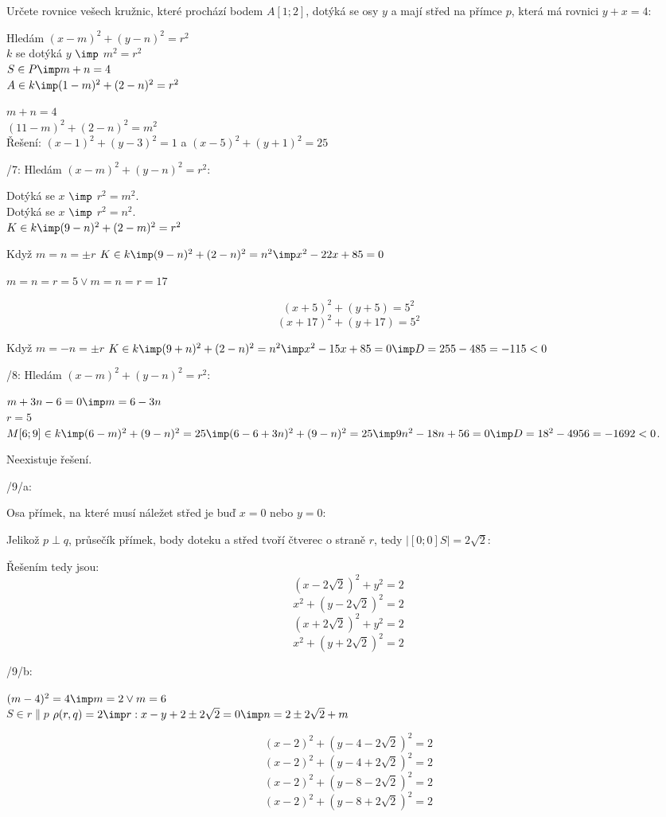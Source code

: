 
\BeginDoc{}
 \Pr Určete rovnice vešech kružnic, které prochází bodem $A[1;2]$, dotýká se osy $y$ a mají střed na přímce $p$, která má rovnici $y+x = 4$:

 Hledám $(x-m)^2 + (y-n)^2 = r^2$\\
$k$ se dotýká $y$ $\imp$ $m^2 = r^2$\\
$S \in P \imp m + n  = 4$\\
$A \in k \imp (1-m)^2 + (2-n)^2 = r^2$

$m+n = 4$\\
$(11-m)^2 + (2-n)^2 = m^2 $\\

Řešení:
$(x-1)^2 + (y-3)^2 = 1$
a
$(x-5)^2 + (y+1)^2 = 25$

/7:
Hledám $(x-m)^2 + (y-n)^2 = r^2$:

Dotýká se $x$ $\imp$ $r^2 = m^2$.\\
Dotýká se $x$ $\imp$ $r^2 = n^2$.\\
$K \in k \imp (9-n)^2 + (2-m)^2 = r^2 $ 

Když $m=n=\pm r$
$K \in k \imp (9-n)^2 + (2-n)^2 = n^2 \imp x^2-22x + 85 =0$ 

$m=n=r=5 \lor m=n=r = 17$

$$ (x+5)^2 + (y+5) = 5^2 $$
$$ (x+17)^2 + (y+17) = 5^2 $$

Když $m=-n=\pm r$
$K \in k \imp (9+n)^2 + (2-n)^2 = n^2 \imp x^2-15x + 85 =0 \imp D=255-4\*85 = -115 < 0$ 

/8:
Hledám $(x-m)^2 + (y-n)^2 = r^2$:

$m+3n-6 = 0 \imp m = 6-3n$\\
$r=5$\\
$M[6;9] \in k \imp (6-m)^2 + (9-n)^2 = 25 \imp (6-6+3n)^2 + (9-n)^2 = 25 \imp 9n^2 -18n+56 = 0 \imp D = 18^2 - 4 \* 9 \* 56 = -1692 < 0$.

Neexistuje řešení.

/9/a:

Osa přímek, na které musí náležet střed je buď $x=0$ nebo $y=0$:

Jelikož $p\perp q$, průsečík přímek, body doteku a střed tvoří čtverec o straně $r$, tedy $|[0;0]S| = 2\sqrt 2$:

Řešením tedy jsou:
$$ (x-2\sqrt 2)^2 + y^2 = 2 $$
$$ x^2 + (y-2\sqrt 2)^2 = 2 $$
$$ (x+2\sqrt 2)^2 + y^2 = 2 $$
$$ x^2 + (y+2\sqrt 2)^2 = 2 $$

/9/b:

$(m-4)^2 = 4  \imp m = 2 \lor m = 6$\\
$S \in r \parallel p$
$\rho(r,q) = 2 \imp r:x-y+2\pm 2\sqrt 2=0  \imp n = 2\pm 2\sqrt 2  +m $

$$ (x-2)^2 + (y-4-2 \sqrt 2)^2 = 2 $$
$$ (x-2)^2 + (y-4+2 \sqrt 2)^2 = 2 $$
$$ (x-2)^2 + (y-8-2 \sqrt 2)^2 = 2 $$
$$ (x-2)^2 + (y-8+2 \sqrt 2)^2 = 2 $$

\EndDoc
